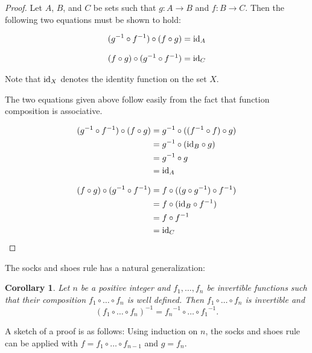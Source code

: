 \documentclass[12pt]{article}
\newtheorem*{cor*}{Corollary}
\begin{document}
\begin{proof}
Let $A$, $B$, and $C$ be sets such that $g \colon A \to B$ and $f \colon B \to C$.  Then the following two equations must be shown to hold:

\begin{align}
(g^{-1} \circ f^{-1}) \circ (f \circ g)=\hbox{id}_A
\end{align}

\begin{align}
(f \circ g) \circ (g^{-1} \circ f^{-1})=\hbox{id}_C
\end{align}

Note that $\hbox{id}_X$ denotes the identity function on the set $X$.

The two equations given above follow easily from the fact that function composition is associative.

\begin{align*}
(g^{-1} \circ f^{-1}) \circ (f \circ g) & =g^{-1} \circ ((f^{-1} \circ f) \circ g) \\
                                        & =g^{-1} \circ (\hbox{id}_B \circ g) \\
                                        & =g^{-1} \circ g \\
                                        & =\hbox{id}_A
\end{align*}

\begin{align*}
(f \circ g) \circ (g^{-1} \circ f^{-1}) & =f \circ ((g \circ g^{-1}) \circ f^{-1}) \\
                                        & =f \circ (\hbox{id}_B \circ f^{-1}) \\
                                        & =f \circ f^{-1} \\
                                        & =\hbox{id}_C \qedhere
\end{align*}

\end{proof}

The socks and shoes rule has a natural generalization:

\begin{cor*}
Let $n$ be a positive integer and $f_1,\dots,f_n$ be invertible functions such that their composition $f_1\circ\dots\circ f_n$ is well defined.  Then $f_1\circ\dots\circ f_n$ is invertible and
\[
(f_1\circ\dots\circ f_n)^{-1}={f_n}^{-1}\circ\dots\circ{f_1}^{-1}.
\]
\end{cor*}

A sketch of a proof is as follows:  Using induction on $n$, the socks and shoes rule can be applied with $f=f_1\circ\dots\circ f_{n-1}$ and $g=f_n$.
\end{document}
